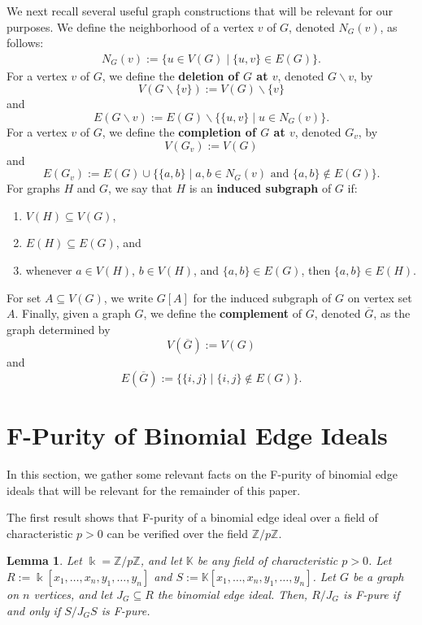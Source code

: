 \documentclass[12pt,a4paper]{amsart}
\theoremstyle{plain}
\newtheorem{lem}[thrm]{Lemma}
\def\blem{\begin{lem}}
\def\elem{\end{lem}}
\theoremstyle{definition}
\theoremstyle{remark}
\let\setminus=\smallsetminus
\def\Z{\mathbb{Z}}
\def\K{\mathbb{K}}
\def\k{\Bbbk}
\def\kk{\Bbbk}
\newcommand{\ol}[1]{\overline{#1}}
\renewcommand{\subset}{\subseteq}
\begin{document}
We next recall several useful graph constructions that will be relevant for our purposes. We define the neighborhood of a vertex $v$ of $G$, denoted $N_{G}(v)$, as follows:
\begin{align*}
    N_{G}(v) := \{u \in V(G) \mid \{u,v\} \in E(G) \}.
\end{align*}
For a vertex $v$ of $G$, we define the \textbf{deletion of $G$ at $v$}, denoted $G \setminus v$, by $$V(G \setminus \{v\}) := V(G)\setminus \{v\}$$ and $$E(G \setminus v) := E(G) \setminus \{ \{u,v\} \mid u \in N_{G}(v) \}.$$ For a vertex $v$ of $G$, we define the \textbf{completion of $G$ at $v$}, denoted $G_{v}$, by $$V(G_{v}) := V(G)$$ and $$E(G_{v}) := E(G) \cup \{ \{a,b \} \mid a,b \in N_{G}(v) \text{ and } \{a,b\} \notin E(G) \}.$$ 
For graphs $H$ and $G$, we say that $H$ is an \textbf{induced subgraph} of $G$ if:
\begin{enumerate}
    \item $V(H) \subset V(G)$, 
    \item $E(H) \subset E(G)$, and 
    \item whenever $a \in V(H)$, $b \in V(H)$, and $\{a,b\} \in E(G)$, then $\{a,b\} \in E(H)$. 
\end{enumerate}
For set $A \subseteq V(G)$, we write $G[A]$ for the induced subgraph of $G$ on vertex set $A$.  Finally, given a graph $G$, we define the \textbf{complement} of $G$, denoted $\ol{G}$, as the graph determined by $$V(\ol{G}) := V(G)$$ and $$E(\ol{G}) := \{ \{i,j\} \mid \{i,j\} \notin E(G) \}.$$

\section{F-Purity of Binomial Edge Ideals}\label{sec:background_F_pure_bei}

In this section, we gather some relevant facts on the F-purity of binomial edge ideals that will be relevant for the remainder of this paper. 

The first result shows that F-purity of a binomial edge ideal over a field of characteristic $p > 0$ can be verified over the field $\Z/p\Z$.

\blem 
\label{lem:reduction_to_Z_mod_2}
Let $\kk = \Z/p\Z$, and let $\K$ be any field of characteristic $p > 0$. Let $R := \k[x_{1},\ldots,x_{n},y_{1},\ldots,y_{n}]$ and $S := \K[x_{1},\ldots,x_{n},y_{1},\ldots,y_{n}]$. Let $G$ be a graph on $n$ vertices, and let $J_{G} \subset R$ the binomial edge ideal. Then, $R/J_{G}$ is F-pure if and only if $S/J_{G}S$ is F-pure.
\elem 
\end{document}
